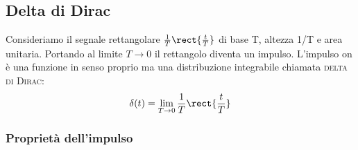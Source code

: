 \subsection{Delta di Dirac}
Consideriamo il segnale rettangolare $\frac{1}{T} \rect{\frac{t}{T}}$ di base T, altezza 1/T e area unitaria. Portando al limite $T\to 0$ il rettangolo diventa un impulso. L'impulso on è una funzione in senso proprio ma una distribuzione integrabile chiamata \textsc{delta di Dirac}:
\begin{equation}
	\delta(t)=\lim\limits_{T\to 0}\frac{1}{T}\rect{\frac{t}{T}}
\end{equation}

\subsubsection{Proprietà dell'impulso}
